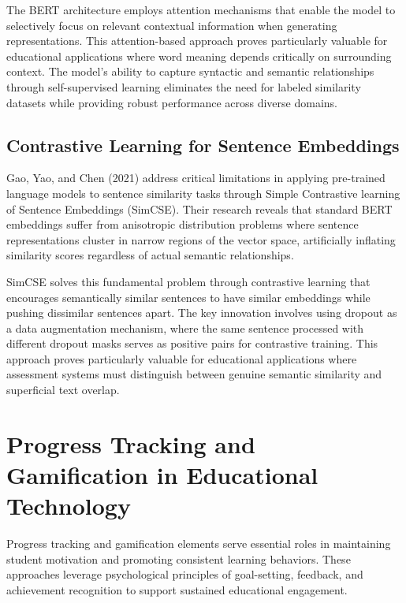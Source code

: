 {The BERT architecture employs attention mechanisms that enable the model to selectively focus on relevant contextual information when generating representations. This attention-based approach proves particularly valuable for educational applications where word meaning depends critically on surrounding context. The model's ability to capture syntactic and semantic relationships through self-supervised learning eliminates the need for labeled similarity datasets while providing robust performance across diverse domains.

\subsection{Contrastive Learning for Sentence Embeddings}

Gao, Yao, and Chen (2021) address critical limitations in applying pre-trained language models to sentence similarity tasks through Simple Contrastive learning of Sentence Embeddings (SimCSE). Their research reveals that standard BERT embeddings suffer from anisotropic distribution problems where sentence representations cluster in narrow regions of the vector space, artificially inflating similarity scores regardless of actual semantic relationships.

SimCSE solves this fundamental problem through contrastive learning that encourages semantically similar sentences to have similar embeddings while pushing dissimilar sentences apart. The key innovation involves using dropout as a data augmentation mechanism, where the same sentence processed with different dropout masks serves as positive pairs for contrastive training. This approach proves particularly valuable for educational applications where assessment systems must distinguish between genuine semantic similarity and superficial text overlap.
}


\section{Progress Tracking and Gamification in Educational Technology}

Progress tracking and gamification elements serve essential roles in maintaining student motivation and promoting consistent learning behaviors. These approaches leverage psychological principles of goal-setting, feedback, and achievement recognition to support sustained educational engagement.

